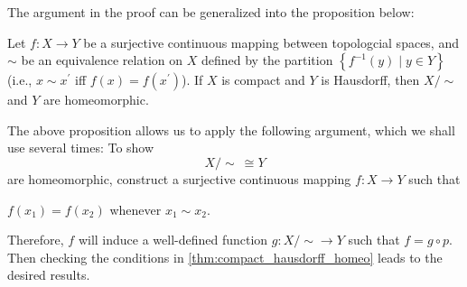 The argument in the proof can be generalized into the proposition below:

\begin{proposition} \label{prop:quotient_homeo} Let \(f: X \rightarrow  Y\) be a surjective continuous mapping between topologcial spaces, and \(\sim\) be an equivalence relation on \(X\) defined by the partition \(\left\{  {{f}^{-1}\left( y\right)  \mid  y \in  Y}\right\}\) (i.e., \(x \sim  {x}^{\prime }\) iff \(f\left( x\right)  = f\left( {x}^{\prime }\right)\)). If \(X\) is compact and \(Y\) is Hausdorff, then \(X/ \sim\) and \(Y\) are homeomorphic.
\end{proposition}

The above proposition allows us to apply the following argument, which we shall use several times: To show 
\[X/ \sim\ \cong Y\] 
are homeomorphic, construct a surjective continuous mapping \(f: X \rightarrow  Y\) such that 
\begin{center}
\(f\left( {x}_{1}\right)  = f\left( {x}_{2}\right)\) whenever \({x}_{1} \sim  {x}_{2}\). 
\end{center}
Therefore, \(f\) will induce a well-defined function \(g: X/ \sim   \rightarrow  Y\) such that \(f = g \circ  p\). Then checking the conditions in \autoref{thm:compact_hausdorff_homeo} leads to the desired results.


